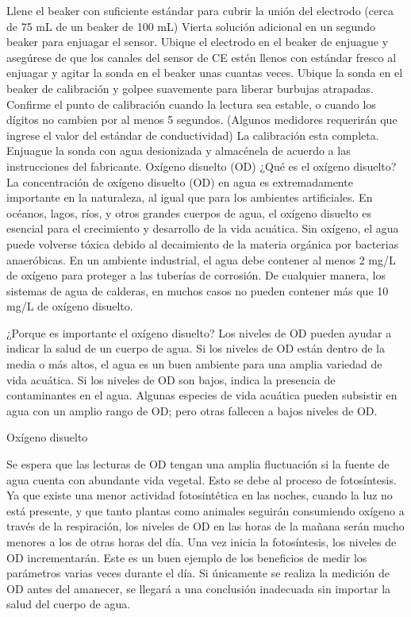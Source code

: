 Llene el beaker con suficiente estándar para cubrir la unión del electrodo (cerca de 75 mL de un beaker de 100 mL) Vierta solución adicional en un segundo beaker para enjuagar el sensor.
Ubique el electrodo en el beaker de enjuague y asegúrese de que los canales del sensor de CE estén llenos con estándar fresco al enjuagar y agitar la sonda en el beaker unas cuantas veces.
Ubique la sonda en el beaker de calibración y golpee suavemente para liberar burbujas atrapadas.
Confirme el punto de calibración cuando la lectura sea estable, o cuando los dígitos no cambien por al menos 5 segundos. (Algunos medidores requerirán que ingrese el valor del estándar de conductividad)
La calibración esta completa. Enjuague la sonda con agua desionizada y almacénela de acuerdo a las instrucciones del fabricante.
Oxígeno disuelto (OD)
¿Qué es el oxígeno disuelto?
La concentración de oxígeno disuelto (OD) en agua es extremadamente importante en la naturaleza, al igual que para los ambientes artificiales.  En océanos, lagos, ríos, y otros grandes cuerpos de agua, el oxígeno disuelto es esencial para el crecimiento y desarrollo de la vida acuática.  Sin oxígeno, el agua puede volverse tóxica debido al decaimiento de la materia orgánica por bacterias anaeróbicas.  En un ambiente industrial, el agua debe contener al menos 2 mg/L de oxígeno para proteger a las tuberías de corrosión.  De cualquier manera, los sistemas de agua de calderas, en muchos casos no pueden contener más que 10 mg/L de oxígeno disuelto.

¿Porque es importante el oxígeno disuelto?
Los niveles de OD pueden ayudar a indicar la salud de un cuerpo de agua. Si los niveles de OD están dentro de la media o más altos, el agua es un buen ambiente para una amplia variedad de vida acuática. Si los niveles de OD son bajos, indica la presencia de contaminantes en el agua. Algunas especies de vida acuática pueden subsistir en agua con un amplio rango de OD; pero otras fallecen a bajos niveles de OD.


Oxígeno disuelto


Se espera que las lecturas de OD tengan una amplia fluctuación si la fuente de agua cuenta con abundante vida vegetal. Esto se debe al proceso de fotosíntesis. Ya que existe una menor actividad fotosintética en las noches, cuando la luz no está presente, y que tanto plantas como animales seguirán consumiendo oxígeno a través de la respiración, los niveles de OD en las horas de la mañana serán mucho menores a los de otras horas del día. Una vez inicia la fotosíntesis, los niveles de OD incrementarán. Este es un buen ejemplo de los beneficios de medir los parámetros varias veces durante el día. Si únicamente se realiza la medición de OD antes del amanecer, se llegará a una conclusión inadecuada sin importar la salud del cuerpo de agua.

